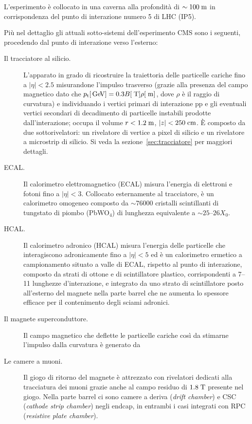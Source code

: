 L’esperimento \`e collocato in una caverna alla profondit\`a di $\sim 100 \rm \; m$ in corrispondenza del punto di interazione numero 5 di LHC (IP5). 

Pi\`u nel dettaglio gli attuali sotto-sistemi dell'esperimento CMS sono i seguenti, procedendo dal punto di interazione verso l'esterno:

\begin{description}
\item[Il tracciatore al silicio.] L'apparato in grado di ricostruire la traiettoria delle particelle cariche fino a $|\eta|<2.5$ misurandone l'impulso trasverso (grazie alla presenza del campo magnetico dato che ${p_{\rm t}} [{\rm \, Ge\kern-0.125em V}] = 0.3 B [\rm \; T] \rho [\rm \; m]$, dove $\rho$ \`e il raggio di curvatura) e individuando i vertici primari di interazione pp e gli eventuali vertici secondari di decadimento di particelle instabili prodotte dall'interazione; occupa il volume $r<1.2\rm \; m$, $|z|<250\rm \; cm$. \`E composto da due sottorivelatori: un rivelatore di vertice a pixel di silicio e un rivelatore a microstrip di silicio. Si veda la sezione~\ref{sec:tracciatore} per maggiori dettagli.
\item[ECAL.] Il calorimetro elettromagnetico (ECAL) misura l’energia di elettroni e fotoni fino a $|\eta|<3$. Collocato esternamente al tracciatore, \`e un calorimetro omogeneo composto da $\sim 76000$ cristalli scintillanti di tungstato di piombo (PbWO$_4$) di lunghezza equivalente a $\sim 25$--$26X_0$.
\item[HCAL.] Il calorimetro adronico (HCAL) misura l'energia delle particelle che interagiscono adronicamente fino a $|\eta|<5$ ed \`e un calorimetro ermetico a campionamento situato a valle di ECAL, rispetto al punto di interazione, composto da strati di ottone e di scintillatore plastico, corrispondenti a 7--11 lunghezze d'interazione, e integrato da uno strato di scintillatore posto all'esterno del magnete nella parte barrel che ne aumenta lo spessore efficace per il contenimento degli sciami adronici.
\item[Il magnete superconduttore.] Il campo magnetico che deflette le particelle cariche cos\`i da stimarne l'impulso dalla curvatura \`e generato da%
\item[Le camere a muoni.] Il giogo di ritorno del magnete \`e attrezzato con rivelatori dedicati alla tracciatura dei muoni grazie anche al campo residuo di $1.8\rm \; T$ presente nel giogo. Nella parte barrel ci sono camere a deriva ({\em drift chamber}) e CSC ({\em cathode strip chamber}) negli endcap, in entrambi i casi integrati con RPC ({\em resistive plate chamber}).  
\end{description}

